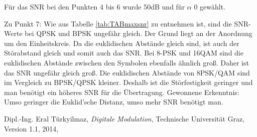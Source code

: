 \documentclass[12pt,a4paper,ngerman]{article}
\begin{document}
Für das SNR bei den Punkten 4 bis 6 wurde 50dB und für $\alpha$ 0 gewählt.\\

\pagebreak

Zu Punkt 7: Wie aus Tabelle \ref{tab:TABmaxsnr} zu entnehmen ist, sind die SNR-Werte bei QPSK und BPSK ungefähr gleich. Der Grund liegt an der Anordnung um den Einheitskreis. Da die euklidischen Abstände gleich sind, ist auch der Störabstand gleich und somit auch das SNR. Bei 8-PSK und 16QAM sind die euklidischen Abstände zwischen den Symbolen ebenfalls ähnlich groß. Daher ist das SNR ungefähr gleich groß. Die euklidischen Abstände von 8PSK/QAM sind im Vergleich zu BPSK/QPSK kleiner. Deshalb ist die Störfestigkeit geringer und man benötigt ein höheres SNR für die Übertragung.  Gewonnene Erkenntnis: Umso geringer die Euklid'sche Distanz, umso mehr SNR benötigt man. 




 \begin{thebibliography}{9}

  Dipl.-Ing. Eral Türkyilmaz,
  \emph{Digitale Modulation},
  Technische Universität Graz,
  Version 1.1, 2014,

\end{thebibliography}



   
\end{document}
